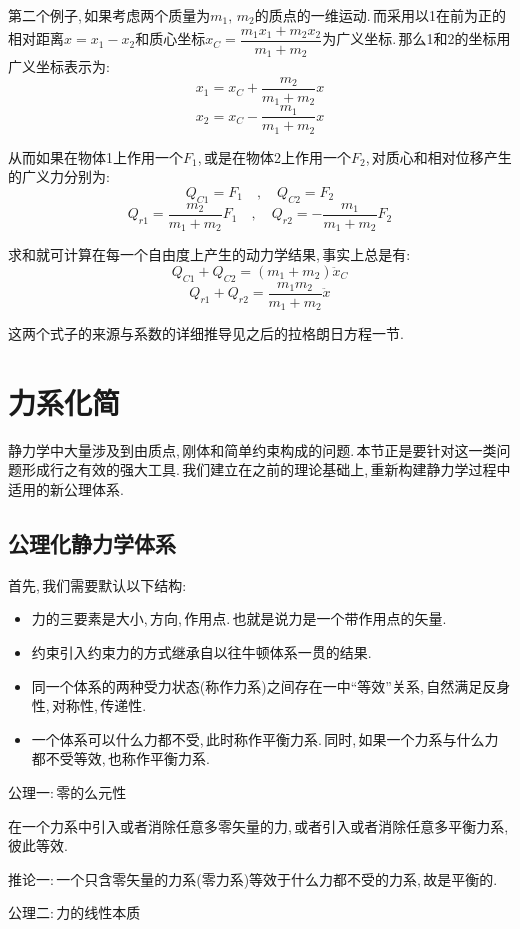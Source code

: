 第二个例子,\,如果考虑两个质量为$m_1,\,m_2$的质点的一维运动.\,而采用以1在前为正的相对距离$x=x_1-x_2$和质心坐标$x_C=\dfrac{m_1x_1+m_2x_2}{m_1+m_2}$为广义坐标.\,那么1和2的坐标用广义坐标表示为:
\[x_1=x_C+\frac{m_2}{m_1+m_2}x\]
\[x_2=x_C-\frac{m_1}{m_1+m_2}x\]

从而如果在物体1上作用一个$F_1$,\,或是在物体2上作用一个$F_2$,\,对质心和相对位移产生的广义力分别为:
\[Q_{C1}=F_1 \quad,\quad Q_{C2}=F_2\]
\[Q_{r1}=\frac{m_2}{m_1+m_2}F_1\quad,\quad Q_{r2}=-\frac{m_1}{m_1+m_2} F_2\]

求和就可计算在每一个自由度上产生的动力学结果,\,事实上总是有:
\[Q_{C1}+Q_{C2}=(m_1+m_2)\ddot{x}_C\]
\[Q_{r1}+Q_{r2}=\frac{m_1m_2}{m_1+m_2}\ddot{x}\]

这两个式子的来源与系数的详细推导见之后的拉格朗日方程一节.

\section{力系化简}

静力学中大量涉及到由质点,\,刚体和简单约束构成的问题.\,本节正是要针对这一类问题形成行之有效的强大工具.\,我们建立在之前的理论基础上,\,重新构建静力学过程中适用的新公理体系.

\subsection{公理化静力学体系}

首先,\,我们需要默认以下结构:
\begin{itemize}
	\item 力的三要素是大小,\,方向,\,作用点.\,也就是说力是一个带作用点的矢量.
	\item 约束引入约束力的方式继承自以往牛顿体系一贯的结果.\,
	\item 同一个体系的两种受力状态(称作力系)之间存在一中``等效''关系,\,自然满足反身性,\,对称性,\,传递性.
	\item 一个体系可以什么力都不受,\,此时称作平衡力系.\,同时,\,如果一个力系与什么力都不受等效,\,也称作平衡力系.
\end{itemize}

\vspace{1cm}
公理一:\,零的么元性

在一个力系中引入或者消除任意多零矢量的力,\,或者引入或者消除任意多平衡力系,\,彼此等效.

推论一:\,一个只含零矢量的力系(零力系)等效于什么力都不受的力系,\,故是平衡的.


\vspace{1cm}
公理二:\,力的线性本质

